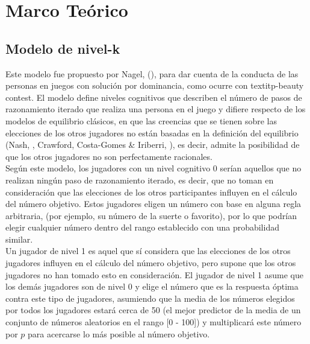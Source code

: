\chapter{Marco Teórico} %

\label{Cap_SDT} %


\newcommand{\keyword}[1]{\textbf{#1}}
\newcommand{\tabhead}[1]{\textbf{#1}}
\newcommand{\code}[1]{\texttt{#1}}
\newcommand{\file}[1]{\texttt{\bfseries#1}}
\newcommand{\option}[1]{\texttt{\itshape#1}}


\section{Modelo de nivel-k}

Este modelo fue propuesto por Nagel, (\citeyear{Nagel}), para dar cuenta de la conducta de las personas en juegos con solución por dominancia, como ocurre con textit{p-beauty contest}. El modelo define niveles cognitivos que describen el número de pasos de razonamiento iterado que realiza una persona en el juego y difiere respecto de los modelos de equilibrio clásicos, en que las creencias que se tienen sobre las elecciones de los otros jugadores no están basadas en la definición del equilibrio (Nash, \citeyear{Nash}, Crawford, Costa-Gomes & Iriberri, \citeyear{Crawford}), es decir, admite la posibilidad de que los otros jugadores no son perfectamente racionales.\\ 

Según este modelo, los jugadores con un nivel cognitivo 0 serían aquellos que no realizan ningún paso de razonamiento iterado, es decir, que no toman en consideración que las elecciones de los otros participantes influyen en el cálculo del número objetivo. Estos jugadores eligen un número con base en alguna regla arbitraria, (por ejemplo, su número de la suerte o favorito), por lo que podrían elegir cualquier número dentro del rango establecido con una probabilidad similar.\\

Un jugador de nivel 1 es aquel que sí considera que las elecciones de los otros jugadores influyen en el cálculo del número objetivo, pero supone que los otros jugadores no han tomado esto en consideración. El jugador de nivel 1 asume que los demás jugadores son de nivel 0 y elige el número que es la respuesta óptima contra este tipo de jugadores, asumiendo que la media de los números elegidos por todos los jugadores estará cerca de 50 (el mejor predictor de la media de un conjunto de números aleatorios en el rango [0 - 100]) y multiplicará este número por $p$ para acercarse lo más posible al número objetivo.\\

